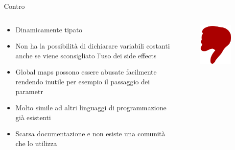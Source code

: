 \begin{frame}{Contro}

	\begin{columns}

		\begin{column}{1\textwidth}

			\begin{itemize}
				\item Dinamicamente tipato
				\item Non ha la possibilità di dichiarare variabili costanti anche se viene sconsigliato l'uso dei side effects
				\item Global maps possono essere abusate facilmente rendendo inutile per esempio il passaggio dei parametr
				\item Molto simile ad altri linguaggi di programmazione già esistenti
				\item Scarsa documentazione e non esiste una comunità che lo utilizza
			\end{itemize}

		\end{column}

		\begin{column}{0.1\textwidth}
			\begin{figure}
				\vspace*{-5cm}
				\hspace*{-2cm}
				\includegraphics[scale=0.3]{res/contro}
			\end{figure}
		\end{column}

	\end{columns}

\end{frame}